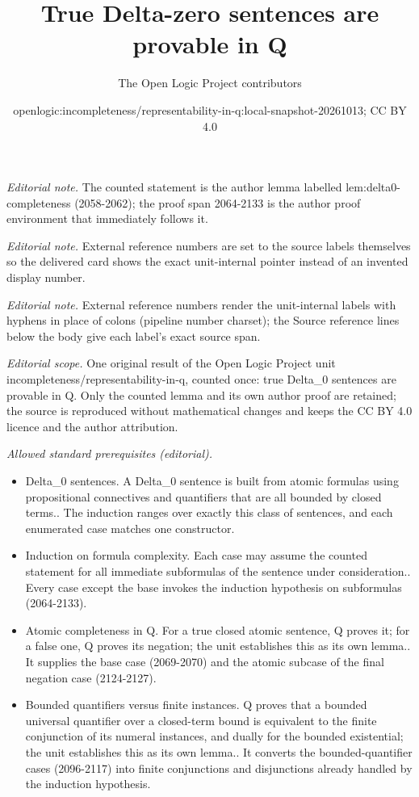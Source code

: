 \documentclass[10pt,a4paper]{article}
\title{True Delta-zero sentences are provable in Q}
\author{The Open Logic Project contributors}
\date{openlogic:incompleteness/representability-in-q:local-snapshot-20261013; CC BY 4.0}
\theoremstyle{plain}
\theoremstyle{definition}
\theoremstyle{remark}
\begin{document}
\maketitle
\noindent\textit{Editorial note.} The counted statement is the author lemma labelled lem:delta0-completeness (2058-2062); the proof span 2064-2133 is the author proof environment that immediately follows it.\par\medskip
\noindent\textit{Editorial note.} External reference numbers are set to the source labels themselves so the delivered card shows the exact unit-internal pointer instead of an invented display number.\par\medskip
\noindent\textit{Editorial note.} External reference numbers render the unit-internal labels with hyphens in place of colons (pipeline number charset); the Source reference lines below the body give each label's exact source span.\par\medskip
\noindent\textit{Editorial scope.} One original result of the Open Logic Project unit incompleteness/representability-in-q, counted once: true Delta\_0 sentences are provable in Q. Only the counted lemma and its own author proof are retained; the source is reproduced without mathematical changes and keeps the CC BY 4.0 licence and the author attribution.\par\medskip
\noindent\textit{Allowed standard prerequisites (editorial).}\begin{itemize}
\item Delta\_0 sentences. A Delta\_0 sentence is built from atomic formulas using propositional connectives and quantifiers that are all bounded by closed terms.. The induction ranges over exactly this class of sentences, and each enumerated case matches one constructor.
\item Induction on formula complexity. Each case may assume the counted statement for all immediate subformulas of the sentence under consideration.. Every case except the base invokes the induction hypothesis on subformulas (2064-2133).
\item Atomic completeness in Q. For a true closed atomic sentence, Q proves it; for a false one, Q proves its negation; the unit establishes this as its own lemma.. It supplies the base case (2069-2070) and the atomic subcase of the final negation case (2124-2127).
\item Bounded quantifiers versus finite instances. Q proves that a bounded universal quantifier over a closed-term bound is equivalent to the finite conjunction of its numeral instances, and dually for the bounded existential; the unit establishes this as its own lemma.. It converts the bounded-quantifier cases (2096-2117) into finite conjunctions and disjunctions already handled by the induction hypothesis.
\end{itemize}\medskip
\end{document}
